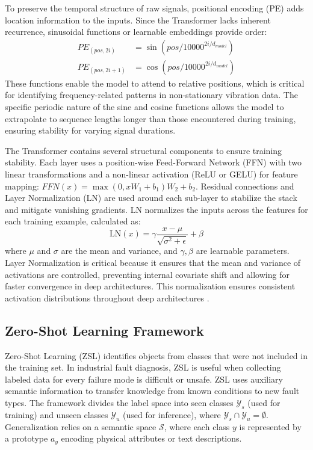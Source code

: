 \documentclass[journal]{IEEEtran}
\begin{document}
To preserve the temporal structure of raw signals, positional encoding (PE) adds location information to the inputs. Since the Transformer lacks inherent recurrence, sinusoidal functions or learnable embeddings provide order:
\begin{equation}
\begin{aligned}
PE_{(pos, 2i)} &= \sin(pos / 10000^{2i/d_{model}}) \\
PE_{(pos, 2i+1)} &= \cos(pos / 10000^{2i/d_{model}})
\end{aligned}
\end{equation}
These functions enable the model to attend to relative positions, which is critical for identifying frequency-related patterns in non-stationary vibration data. The specific periodic nature of the sine and cosine functions allows the model to extrapolate to sequence lengths longer than those encountered during training, ensuring stability for varying signal durations.

The Transformer contains several structural components to ensure training stability. Each layer uses a position-wise Feed-Forward Network (FFN) with two linear transformations and a non-linear activation (ReLU or GELU) for feature mapping: $FFN(x) = \max(0, xW_1 + b_1)W_2 + b_2$. Residual connections and Layer Normalization (LN) are used around each sub-layer to stabilize the stack and mitigate vanishing gradients. LN normalizes the inputs across the features for each training example, calculated as:
\begin{equation}
\text{LN}(x) = \gamma \frac{x - \mu}{\sqrt{\sigma^2 + \epsilon}} + \beta
\end{equation}
where $\mu$ and $\sigma$ are the mean and variance, and $\gamma, \beta$ are learnable parameters. Layer Normalization is critical because it ensures that the mean and variance of activations are controlled, preventing internal covariate shift and allowing for faster convergence in deep architectures. This normalization ensures consistent activation distributions throughout deep architectures \cite{vaswani2017attention}.

\subsection{Zero-Shot Learning Framework}
Zero-Shot Learning (ZSL) identifies objects from classes that were not included in the training set. In industrial fault diagnosis, ZSL is useful when collecting labeled data for every failure mode is difficult or unsafe. ZSL uses auxiliary semantic information to transfer knowledge from known conditions to new fault types. The framework divides the label space into seen classes $\mathcal{Y}_s$ (used for training) and unseen classes $\mathcal{Y}_u$ (used for inference), where $\mathcal{Y}_s \cap \mathcal{Y}_u = \emptyset$. Generalization relies on a semantic space $\mathcal{S}$, where each class $y$ is represented by a prototype $a_y$ encoding physical attributes or text descriptions.
\end{document}
